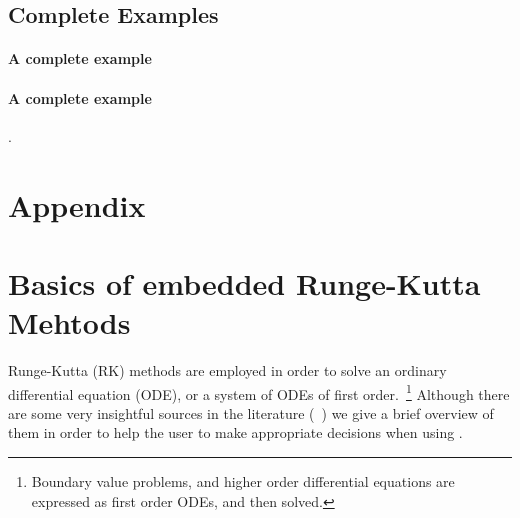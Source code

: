 \documentclass[11pt,a4paper]{article}
\renewcommand{\theequation}{\arabic{section}.\arabic{equation}}
\begin{document}
\subsection{Complete Examples}\label{sec:complete_examples}

\paragraph{A complete \CPP example}

\paragraph{A complete \PY example}

.


\setcounter{section}{0}
\section*{Appendix}
\appendix

\renewcommand{\theequation}{\Alph{section}.\arabic{equation}}
\setcounter{equation}{0}  %

\section{Basics of embedded Runge-Kutta Mehtods}\label{app:RK}
\setcounter{equation}{0}
%
Runge-Kutta (RK) methods are employed in order to solve an ordinary differential equation (ODE), or a system of ODEs of first order.~\footnote{Boundary value problems, and higher order differential equations are expressed as first order ODEs, and then solved.}   Although there are some very insightful sources in the literature (\eg~\cite{Hairer,hairer2010solving,10.5555/1403886}) we give a brief overview of them in order to help the user to make appropriate decisions when using \mimes.
\end{document}
